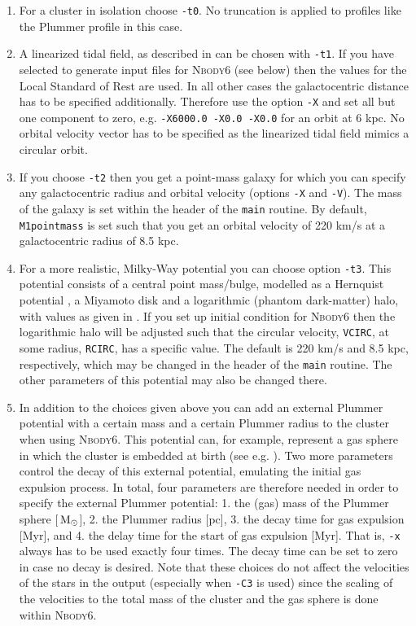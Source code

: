 \documentclass[useAMS,usenatbib]{mn2e}
\newcommand{\msun}{\mbox{$\,{\rm M}_\odot$}}
\begin{document}
\begin{enumerate}
\item For a cluster in isolation choose \texttt{-t0}. No truncation is applied to profiles like the Plummer profile in this case.
\item A linearized tidal field, as described in \citet{Fukushige00} can be chosen with \texttt{-t1}. If you have selected to generate input files for \textsc{Nbody6} (see below) then the values for the Local Standard of Rest are used. In all other cases the galactocentric distance has to be specified additionally. Therefore use the option \texttt{-X} and set all but one component to zero, e.g. \texttt{-X6000.0 -X0.0 -X0.0} for an orbit at 6 kpc. No orbital velocity vector has to be specified as the linearized tidal field mimics a circular orbit.
\item If you choose \texttt{-t2} then you get a point-mass galaxy for which you can specify any galactocentric radius and orbital velocity (options \texttt{-X} and \texttt{-V}). The mass of the galaxy is set within the header of the \texttt{main} routine. By default, \texttt{M1pointmass} is set such that you get an orbital velocity of 220 km/s at a galactocentric radius of 8.5 kpc.
\item For a more realistic, Milky-Way potential you can choose option \texttt{-t3}. This potential consists of a central point mass/bulge, modelled as a Hernquist potential \citep{Hernquist90}, a Miyamoto disk \citep{Miyamoto75} and a logarithmic (phantom dark-matter) halo, with values as given in \citet{Allen91}. If you set up initial condition for \textsc{Nbody6} then the logarithmic halo will be adjusted such that the circular velocity, \texttt{VCIRC}, at some radius, \texttt{RCIRC}, has a specific value. The default is 220 km/s and 8.5 kpc, respectively, which may be changed in the header of the \texttt{main} routine. The other parameters of this potential may also be changed there.
\item In addition to the choices given above you can add an external Plummer potential with a certain mass and a certain Plummer radius to the cluster when using \textsc{Nbody6}. This potential can, for example, represent a gas sphere in which the cluster is embedded at birth (see e.g. \citealt{Baumgardt07}). Two more parameters control the decay of this external potential, emulating the initial gas expulsion process. In total, four parameters are therefore needed in order to specify the external Plummer potential: 1. the (gas) mass of the Plummer sphere [$\msun$], 2. the Plummer radius [pc], 3. the decay time for gas expulsion [Myr], and 4. the delay time for the start of gas expulsion [Myr]. That is, \texttt{-x} always has to be used exactly four times. The decay time can be set to zero in case no decay is desired. Note that these choices do not affect the velocities of the stars in the output (especially when \texttt{-C3} is used) since the scaling of the velocities to the total mass of the cluster and the gas sphere is done within \textsc{Nbody6}. 
 
\end{enumerate}
\end{document}

